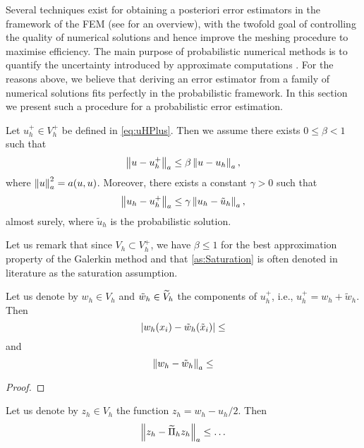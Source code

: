 \documentclass[10pt]{article}
\begin{document}
Several techniques exist for obtaining a posteriori error estimators in the framework of the FEM (see \cite{Ver13} for an overview), with the twofold goal of controlling the quality of numerical solutions and hence improve the meshing procedure to maximise efficiency. The main purpose of probabilistic numerical methods is to quantify the uncertainty introduced by approximate computations \cite{HOG15}. For the reasons above, we believe that deriving an error estimator from a family of numerical solutions fits perfectly in the probabilistic framework. In this section we present such a procedure for a probabilistic error estimation.
\begin{assumption}\label{as:Saturation} Let $u_h^+ \in V_h^+$ be defined in \eqref{eq:uHPlus}. Then we assume there exists $0 \leq \beta < 1$ such that
	\begin{equation}
		\left\|u - u_h^+\right\|_a \leq \beta \left\|u - u_h\right\|_a,
	\end{equation} 
	where $\left\|u\right\|_a^2 = a(u, u)$. Moreover, there exists a constant $\gamma > 0$ such that
	\begin{equation}\label{eq:Saturation2}
		\left\|u_h - u_h^+\right\|_a \leq \gamma \left\|u_h - \tilde u_h\right\|_a,
	\end{equation}
	almost surely, where $\tilde u_h$ is the probabilistic solution.
\end{assumption}


Let us remark that since $V_h \subset V_h^+$, we have $\beta \leq 1$ for the best approximation property of the Galerkin method and that \cref{as:Saturation} is often denoted in literature as the saturation assumption.

\begin{lemma} Let us denote by $w_h \in V_h$ and $\tilde w_h \in \widetilde V_h$ the components of $u_h^+$, i.e., $u_h^+ = w_h + \tilde w_h$. Then
	\begin{equation}
		\left\lvert w_h(x_i) - \tilde w_h(\tilde x_i)\right\rvert \leq 
	\end{equation}
	and 
	\begin{equation}
		\left\|w_h - \tilde w_h\right\|_a \leq
	\end{equation}
\end{lemma}
\begin{proof}

\end{proof}

\begin{lemma} Let us denote by $z_h \in V_h$ the function $z_h = w_h - u_h /2$. Then
	\begin{equation}
		\left\|z_h - \widetilde \Pi_h z_h\right\|_a \leq \ldots
	\end{equation}
\end{lemma}
\end{document}
